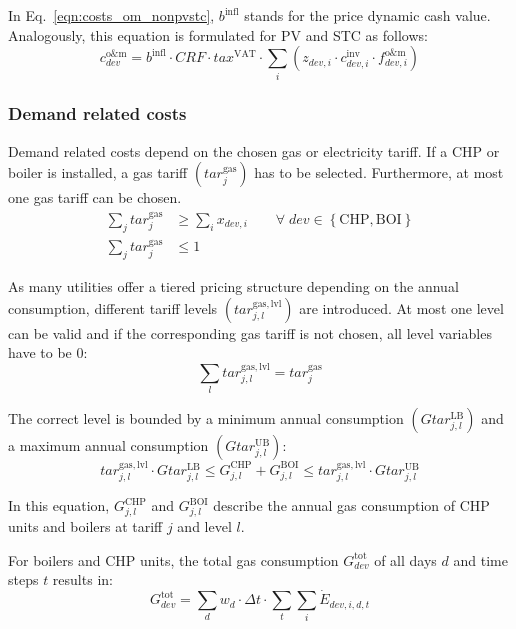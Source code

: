 In Eq.~\ref{eqn:costs_om_nonpvstc}, $b^{\mathrm{infl}}$ stands for the price dynamic cash value.
Analogously, this equation is formulated for PV and STC as follows:
\begin{equation}
	c^\mathrm{o\&m}_{dev} = b^{\mathrm{infl}} \cdot CRF \cdot tax^\mathrm{VAT} \cdot \sum\limits_{i} \left( z_{dev,i} \cdot c^\mathrm{inv}_{dev,i} \cdot f^{\mathrm{o\&m}}_{dev,i} \right)
\end{equation}

\subsubsection{Demand related costs}

Demand related costs depend on the chosen gas or electricity tariff.
If a CHP or boiler is installed, a gas tariff $\left(tar^\mathrm{gas}_{j}\right)$ has to be selected.
Furthermore, at most one gas tariff can be chosen.
\begin{align}
	\sum\limits_{j} tar^\mathrm{gas}_{j} &\ge \sum\limits_{i} x_{dev,i} \qquad \forall \; dev \in \left\lbrace\mathrm{CHP, BOI}\right\rbrace\\
	\sum\limits_{j} tar^\mathrm{gas}_{j} &\le 1
\end{align}

As many utilities offer a tiered pricing structure depending on the annual consumption, different tariff levels $\left(tar^\mathrm{gas,lvl}_{j,l}\right)$ are introduced.
At most one level can be valid and if the corresponding gas tariff is not chosen, all level variables have to be 0:
\begin{equation}
	\sum\limits_{l} tar^\mathrm{gas,lvl}_{j,l} = tar^\mathrm{gas}_{j}
\end{equation}

The correct level is bounded by a minimum annual consumption $\left(Gtar^\mathrm{LB}_{j,l}\right)$ and a maximum annual consumption $\left(Gtar^\mathrm{UB}_{j,l}\right)$:
\begin{equation}
	tar^\mathrm{gas,lvl}_{j,l} \cdot Gtar^\mathrm{LB}_{j,l} \le G^\mathrm{CHP}_{j,l} + G^\mathrm{BOI}_{j,l} \le tar^\mathrm{gas,lvl}_{j,l} \cdot Gtar^\mathrm{UB}_{j,l}
\end{equation}

In this equation, $G^\mathrm{CHP}_{j,l}$ and $G^\mathrm{BOI}_{j,l}$ describe the annual gas consumption of CHP units and boilers at tariff $j$ and level $l$.

For boilers and CHP units, the total gas consumption $G^\mathrm{tot}_{dev}$ of all days $d$ and time steps $t$ results in:
\begin{equation}
	G^\mathrm{tot}_{dev} = \sum\limits_{d} w_d \cdot \Delta t \cdot \sum\limits_{t} \sum\limits_{i} \dot{E}_{dev,i,d,t}
\end{equation}

